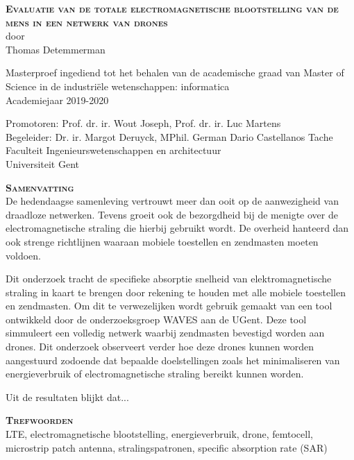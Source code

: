 \begin{center}
\textsc{\textbf{\Huge Evaluatie van de totale electromagnetische blootstelling van de mens in een netwerk van drones}}\\

door\\
Thomas Detemmerman

Masterproef ingediend tot het behalen van de academische graad van Master of Science in de
industri\"ele wetenschappen: informatica\\
Academiejaar 2019-2020

Promotoren: Prof. dr. ir. Wout Joseph, Prof. dr. ir. Luc Martens\\
Begeleider: Dr. ir. Margot Deruyck, MPhil. German Dario Castellanos Tache\\
Faculteit Ingenieurswetenschappen en architectuur\\
Universiteit Gent
\end{center}

\textsc{\textbf{\LARGE Samenvatting}}\\

De hedendaagse samenleving vertrouwt meer dan ooit op de aanwezigheid van draadloze netwerken. 
Tevens groeit ook de bezorgdheid bij de menigte over de electromagnetische straling die hierbij gebruikt wordt. De overheid hanteerd dan ook
strenge richtlijnen waaraan mobiele toestellen en zendmasten moeten voldoen.

Dit onderzoek tracht de specifieke absorptie snelheid van elektromagnetische straling in kaart te brengen door rekening te houden met alle mobiele 
toestellen en zendmasten. Om dit te verwezelijken wordt gebruik gemaakt van een tool ontwikkeld door de onderzoeksgroep WAVES aan de UGent. Deze tool
simmuleert een volledig netwerk waarbij zendmasten bevestigd worden aan drones. Dit onderzoek observeert verder hoe deze drones kunnen worden aangestuurd
zodoende dat bepaalde doelstellingen zoals het minimaliseren van energieverbruik of electromagnetische straling bereikt kunnen worden.

Uit de resultaten blijkt dat...

\textsc{\textbf{\LARGE Trefwoorden}}\\

LTE, electromagnetische blootstelling, energieverbruik, drone, femtocell, microstrip patch antenna, stralingspatronen, specific absorption rate (SAR)

